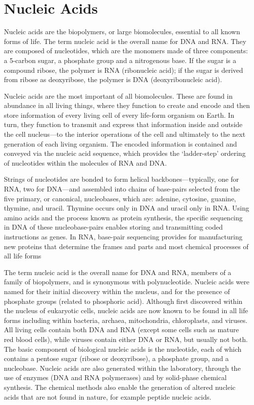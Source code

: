 \hypertarget{nucleic-acids}{%
\section{Nucleic Acids}\label{nucleic-acids}}

Nucleic acids are the biopolymers, or large biomolecules, essential to all known forms of life. The term nucleic acid is the overall name for DNA and RNA. They are composed of nucleotides, which are the monomers made of three components: a 5-carbon sugar, a phosphate group and a nitrogenous base. If the sugar is a compound ribose, the polymer is RNA (ribonucleic acid); if the sugar is derived from ribose as deoxyribose, the polymer is DNA (deoxyribonucleic acid).

Nucleic acids are the most important of all biomolecules. These are found in abundance in all living things, where they function to create and encode and then store information of every living cell of every life-form organism on Earth. In turn, they function to transmit and express that information inside and outside the cell nucleus---to the interior operations of the cell and ultimately to the next generation of each living organism. The encoded information is contained and conveyed via the nucleic acid sequence, which provides the `ladder-step' ordering of nucleotides within the molecules of RNA and DNA.

Strings of nucleotides are bonded to form helical backbones---typically, one for RNA, two for DNA---and assembled into chains of base-pairs selected from the five primary, or canonical, nucleobases, which are: adenine, cytosine, guanine, thymine, and uracil. Thymine occurs only in DNA and uracil only in RNA. Using amino acids and the process known as protein synthesis, the specific sequencing in DNA of these nucleobase-pairs enables storing and transmitting coded instructions as genes. In RNA, base-pair sequencing provides for manufacturing new proteins that determine the frames and parts and most chemical processes of all life forms

The term nucleic acid is the overall name for DNA and RNA, members of a family of biopolymers, and is synonymous with polynucleotide. Nucleic acids were named for their initial discovery within the nucleus, and for the presence of phosphate groups (related to phosphoric acid). Although first discovered within the nucleus of eukaryotic cells, nucleic acids are now known to be found in all life forms including within bacteria, archaea, mitochondria, chloroplasts, and viruses. All living cells contain both DNA and RNA (except some cells such as mature red blood cells), while viruses contain either DNA or RNA, but usually not both. The basic component of biological nucleic acids is the nucleotide, each of which contains a pentose sugar (ribose or deoxyribose), a phosphate group, and a nucleobase. Nucleic acids are also generated within the laboratory, through the use of enzymes (DNA and RNA polymerases) and by solid-phase chemical synthesis. The chemical methods also enable the generation of altered nucleic acids that are not found in nature, for example peptide nucleic acids.

